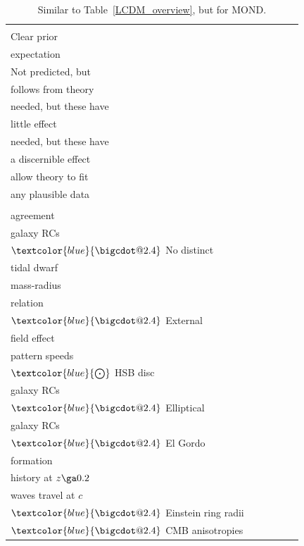 \documentclass[fleqn,usenatbib,useAMS,onecolumn]{mnras} %
\makeatletter
\DeclareRobustCommand*\bigcdot{\mathpalette\bigcdot@{2.4}}
\DeclareRobustCommand*\bigcdot@[2]{\mathbin{\vcenter{\hbox{\scalebox{#2}{$\m@th#1\bullet$}}}}}
\makeatother
\begin{document}
\begin{table}
	\centering
	\caption{Similar to Table~\ref{LCDM_overview}, but for MOND.}
	\begin{tabular}{llllll}
		\hline
		\makecell{} & \makecell{\\ Clear prior \\ expectation} & \makecell{\\ Not predicted, but \\ follows from theory} & \makecell{Auxiliary assumptions \\ needed, but these have \\ little effect} & \makecell{Auxiliary assumptions \\ needed, but these have \\ a discernible effect} & \makecell{Auxiliary assumptions \\ allow theory to fit \\ any plausible data} \\ \hline
		\makecell{Excellent \\ agreement} & \makecell{$\textcolor{blue}{\bigcdot}$ LSB disc \\ galaxy RCs \\ $\textcolor{blue}{\bigcdot}$ No distinct \\ tidal dwarf \\ mass-radius \\ relation \\ $\textcolor{blue}{\bigcdot}$ External \\ field effect} & \makecell{$\textcolor{blue}{\bigcdot}$ Galaxy bar \\ pattern speeds \\ $\textcolor{blue}{\bigodot}$ HSB disc \\ galaxy RCs \\ $\textcolor{blue}{\bigcdot}$ Elliptical \\ galaxy RCs \\ $\textcolor{blue}{\bigcdot}$ El Gordo \\ formation} & & \makecell{$\textcolor{blue}{\bigcdot}$ Expansion \\ history at $z \ga 0.2$} & \makecell{$\textcolor{blue}{\bigcdot}$ Gravitational \\ waves travel at $c$ \\ $\textcolor{blue}{\bigcdot}$ Einstein ring radii \\ $\textcolor{blue}{\bigcdot}$ CMB anisotropies} \\ \hline

\end{tabular}
\end{table}
\end{document}
